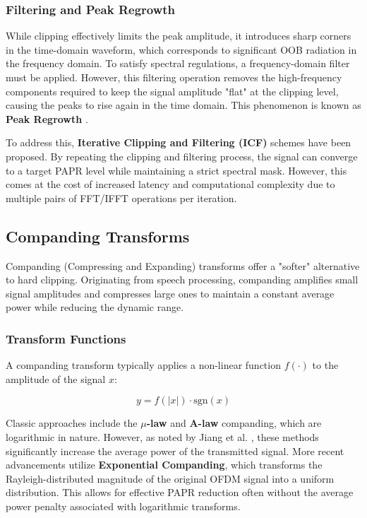 \documentclass[12pt, a4paper, onecolumn]{article}
\begin{document}
\subsubsection{Filtering and Peak Regrowth}
While clipping effectively limits the peak amplitude, it introduces sharp corners in the time-domain waveform, which corresponds to significant OOB radiation in the frequency domain. To satisfy spectral regulations, a frequency-domain filter must be applied. However, this filtering operation removes the high-frequency components required to keep the signal amplitude "flat" at the clipping level, causing the peaks to rise again in the time domain. This phenomenon is known as \textbf{Peak Regrowth} \cite{ref9}.

To address this, \textbf{Iterative Clipping and Filtering (ICF)} schemes have been proposed. By repeating the clipping and filtering process, the signal can converge to a target PAPR level while maintaining a strict spectral mask. However, this comes at the cost of increased latency and computational complexity due to multiple pairs of FFT/IFFT operations per iteration.

\subsection{Companding Transforms}
Companding (Compressing and Expanding) transforms offer a "softer" alternative to hard clipping. Originating from speech processing, companding amplifies small signal amplitudes and compresses large ones to maintain a constant average power while reducing the dynamic range.

\subsubsection{Transform Functions}
A companding transform typically applies a non-linear function $f(\cdot)$ to the amplitude of the signal $x$:

\begin{equation}
    y = f(|x|) \cdot \text{sgn}(x)
\end{equation}

Classic approaches include the \textbf{$\mu$-law} and \textbf{A-law} companding, which are logarithmic in nature. However, as noted by Jiang et al. \cite{ref10}, these methods significantly increase the average power of the transmitted signal. More recent advancements utilize \textbf{Exponential Companding}, which transforms the Rayleigh-distributed magnitude of the original OFDM signal into a uniform distribution. This allows for effective PAPR reduction often without the average power penalty associated with logarithmic transforms.
\end{document}
